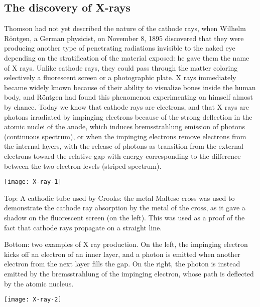 \subsection{The discovery of X-rays}
Thomson had not yet described the nature of the cathode rays, when Wilhelm R\"ontgen, a German physicist, on November 8, 1895 discovered that they were producing another type of penetrating radiations invisible to the naked eye depending on the stratification of the material exposed: he gave them the name of X rays. Unlike cathode rays, they could pass through the matter coloring selectively a fluorescent screen or a photographic plate. X rays immediately became widely known because of their ability to visualize bones inside the human body, and R\"ontgen had found this phenomenon experimenting on himself almost by chance. Today we know that cathode rays are electrons, and that X rays are photons irradiated by impinging electrons because of the strong deflection in the atomic nuclei of the anode, which induces bremsstrahlung emission of photons (continuous spectrum), or when the impinging electrons remove electrons from the internal layers, with the release of photons as transition from the external electrons toward the relative gap with energy corresponding to the difference between the two electron levels (striped spectrum). \\
\begin{framed}

\begin{experiment}

\begin{center}
\texttt{[image: X-ray-1]}
\end{center}

Top: A cathodic tube used by Crooks: the metal Maltese cross was used to demonstrate the cathode ray absorption by the metal of the cross, as it gave a shadow on the fluorescent screen (on the left). This was used as a proof of the fact that cathode rays propagate on a straight line.

Bottom: two examples of X ray production. On the left, the impinging electron kicks off an electron of an inner layer, and a photon is emitted when another electron from the next layer fills the gap. On the right, the photon is instead emitted by the bremsstrahlung of the impinging electron, whose path is deflected by the atomic nucleus.
\begin{center}
\texttt{[image: X-ray-2]}
\end{center}

\end{experiment}
\end{framed}


